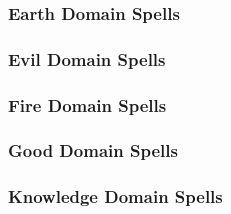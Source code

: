\subsubsection{Earth Domain Spells}

\begin{spelllist}
    \SLearthenblade[1]
    \SLearthspike[2]
    \SLearthspull[3]
    \SLearthglide[4]
    \SLtransmutefleshandstone[5]
    \SLfissure[6]
    \SLgolemheart[7]
    \SLimprisonment[8]
    \SLearthquake[9]
\end{spelllist}

\subsubsection{Evil Domain Spells}

\begin{spelllist}
    \SLprotectionfromalignment[1]
    \SLcurseofbloodandbone[2]
    \SLunholyblight[3]
    \SLenervation[4]
    \SLblasphemy[5]
    \SLharm[6]
    \SLstriptheflesh[7]
    \SLavatarofsuffering[8]
    \SLunholyavatar[9]
\end{spelllist}

\subsubsection{Fire Domain Spells}

\begin{spelllist}
    \SLburninghands[1]
    \SLwalloffire[2]
    \SLfireball[3]
    \SLfireshield[4]
    \SLflamestrike[5]
    \SLinferno[6]
    \SLimmolation[7]
    \SLfirestorm[8]
    \SLmeteorswarm[9]
\end{spelllist}

\subsubsection{Good Domain Spells}

\begin{spelllist}
    \SLprotectionfromalignment[1]
    \SLaid[2]
    \SLholysmite[3]
    \SLavatarofhealing[4]
    \SLholyword[5]
    \SLheal[6]
    \SLdivinejudgment[7]
    \SLmartyrsgift[8]
    \SLholyavatar[9]
\end{spelllist}

\subsubsection{Knowledge Domain Spells}

